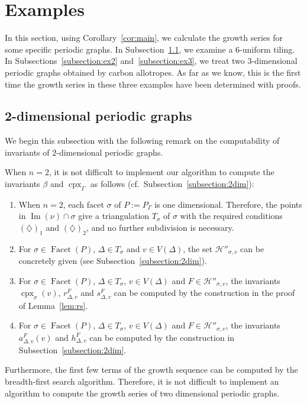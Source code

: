 \documentclass[11pt]{article}
\theoremstyle{definition}
\numberwithin{equation}{section}
\begin{document}
\section{Examples} \label{section:ex}

In this section, using Corollary~\ref{cor:main}, we calculate the growth series for some specific periodic graphs. 
In Subsection~\ref{subsection:tilings}, we examine a $6$-uniform tiling. 
In Subsections~\ref{subsection:ex2} and~\ref{subsection:ex3}, we treat two $3$-dimensional periodic graphs obtained by carbon allotropes. 
As far as we know, this is the first time the growth series in these three examples have been determined with proofs.



\subsection{2-dimensional periodic graphs}\label{subsection:tilings}

We begin this subsection with the following remark on the computability of invariants of  $2$-dimensional periodic graphs.
\begin{rmk}\label{rmk:implement}
When $n=2$, it is not difficult to implement our algorithm to compute the invariants $\beta$ and $\operatorname{cpx}_{\Gamma}$ as follows (cf.\ Subsection~\ref{subsection:2dim}): 

\begin{enumerate}
\item 
When $n=2$, each facet $\sigma$ of $P := P_{\Gamma}$ is one dimensional. 
Therefore, the points in $\operatorname{Im}(\nu) \cap \sigma$ give a triangulation $T_{\sigma}$ of $\sigma$ with the required conditions $(\diamondsuit)_1$ and $(\diamondsuit)_2$, and no further subdivision is necessary.

\item
For $\sigma \in \operatorname{Facet}(P)$, $\Delta \in T_{\sigma}$ and $v \in V(\Delta)$, 
the set $\mathcal{H}'' _{\sigma, v}$ can be concretely given (see  Subsection~\ref{subsection:2dim}). 

\item 
For $\sigma \in \operatorname{Facet}(P)$, $\Delta \in T_{\sigma}$, $v \in V(\Delta)$ and $F \in \mathcal{H}'' _{\sigma, v}$, 
the invariants $\operatorname{cpx}_{\sigma} (v)$, $r^F _{\Delta, v}$ and $s^F _{\Delta, v}$ can be computed by the construction in the proof of Lemma~\ref{lem:rs}. 

\item
For $\sigma \in \operatorname{Facet}(P)$, $\Delta \in T_{\sigma}$, $v \in V(\Delta)$ and $F \in \mathcal{H}'' _{\sigma, v}$, 
the invariants $a^F _{\Delta, v}(v)$ and $h^F _{\Delta, v}$ can be computed by the construction in Subsection~\ref{subsection:2dim}. 
\end{enumerate}
Furthermore, the first few terms of the growth sequence can be computed by the breadth-first search algorithm. 
Therefore, it is not difficult to implement an algorithm to compute the growth series of two dimensional periodic graphs. 
\end{rmk}
\end{document}
